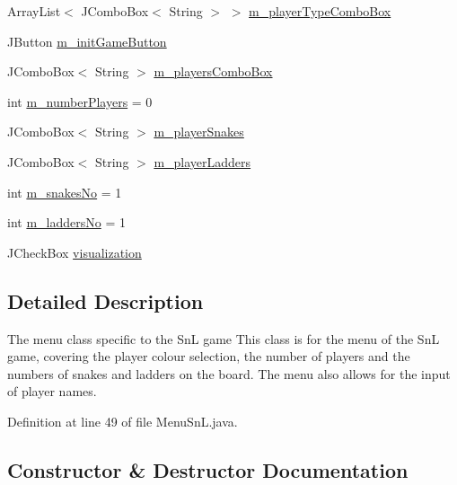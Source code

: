 \begin{DoxyCompactItemize}
\item 
Array\+List$<$ J\+Combo\+Box$<$ String $>$ $>$ \hyperlink{class_menu_1_1_menu_sn_l_a70c6fa4562124ab11bab5d572daf82b3}{m\+\_\+player\+Type\+Combo\+Box}
\item 
J\+Button \hyperlink{class_menu_1_1_menu_sn_l_ac45af15bf2aabd1916063700e1e44f08}{m\+\_\+init\+Game\+Button}
\item 
J\+Combo\+Box$<$ String $>$ \hyperlink{class_menu_1_1_menu_sn_l_a52b5fdac24b1860a453eee6f505208da}{m\+\_\+players\+Combo\+Box}
\item 
int \hyperlink{class_menu_1_1_menu_sn_l_afee3307aa062adfbee4edd14484c8f2c}{m\+\_\+number\+Players} = 0
\item 
J\+Combo\+Box$<$ String $>$ \hyperlink{class_menu_1_1_menu_sn_l_acc735c8e538c308d888618f726ddd344}{m\+\_\+player\+Snakes}
\item 
J\+Combo\+Box$<$ String $>$ \hyperlink{class_menu_1_1_menu_sn_l_a75cae58abbeef1dc893ab2214f84aaad}{m\+\_\+player\+Ladders}
\item 
int \hyperlink{class_menu_1_1_menu_sn_l_a5787c03e612eb9adb0f0ee976810be88}{m\+\_\+snakes\+No} = 1
\item 
int \hyperlink{class_menu_1_1_menu_sn_l_a30c87e65118ddf61c75fa3d9d9abe36e}{m\+\_\+ladders\+No} = 1
\item 
J\+Check\+Box \hyperlink{class_menu_1_1_menu_sn_l_a774bdc16dab9d1c0c882d2212beb70ac}{visualization}
\end{DoxyCompactItemize}


\subsection{Detailed Description}
The menu class specific to the Sn\+L game This class is for the menu of the Sn\+L game, covering the player colour selection, the number of players and the numbers of snakes and ladders on the board. The menu also allows for the input of player names. 

Definition at line 49 of file Menu\+Sn\+L.\+java.



\subsection{Constructor \& Destructor Documentation}
\hypertarget{class_menu_1_1_menu_sn_l_a39167b25cf1ab4be1f66b6a327635e7b}{}
